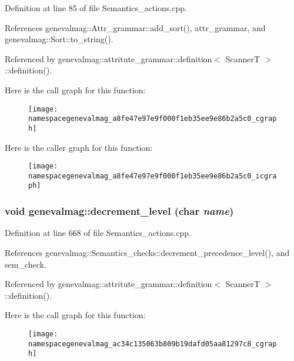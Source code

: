 Definition at line 85 of file Semantics\_\-actions.cpp.



References genevalmag::Attr\_\-grammar::add\_\-sort(), attr\_\-grammar, and genevalmag::Sort::to\_\-string().



Referenced by genevalmag::attritute\_\-grammar::definition$<$ ScannerT $>$::definition().



Here is the call graph for this function:\nopagebreak
\begin{figure}[H]
\begin{center}
\leavevmode
\texttt{[image: namespacegenevalmag\_a8fe47e97e9f000f1eb35ee9e86b2a5c0\_cgraph]}
\end{center}
\end{figure}




Here is the caller graph for this function:\nopagebreak
\begin{figure}[H]
\begin{center}
\leavevmode
\texttt{[image: namespacegenevalmag\_a8fe47e97e9f000f1eb35ee9e86b2a5c0\_icgraph]}
\end{center}
\end{figure}


\hypertarget{namespacegenevalmag_ac34c135063b809b19dafd05aa81297c8}{
\subsubsection[{decrement\_\-level}]{\setlength{\rightskip}{0pt plus 5cm}void genevalmag::decrement\_\-level (char {\em name})}}
\label{namespacegenevalmag_ac34c135063b809b19dafd05aa81297c8}


Definition at line 668 of file Semantics\_\-actions.cpp.



References genevalmag::Semantics\_\-checks::decrement\_\-precedence\_\-level(), and sem\_\-check.



Referenced by genevalmag::attritute\_\-grammar::definition$<$ ScannerT $>$::definition().



Here is the call graph for this function:\nopagebreak
\begin{figure}[H]
\begin{center}
\leavevmode
\texttt{[image: namespacegenevalmag\_ac34c135063b809b19dafd05aa81297c8\_cgraph]}
\end{center}
\end{figure}




